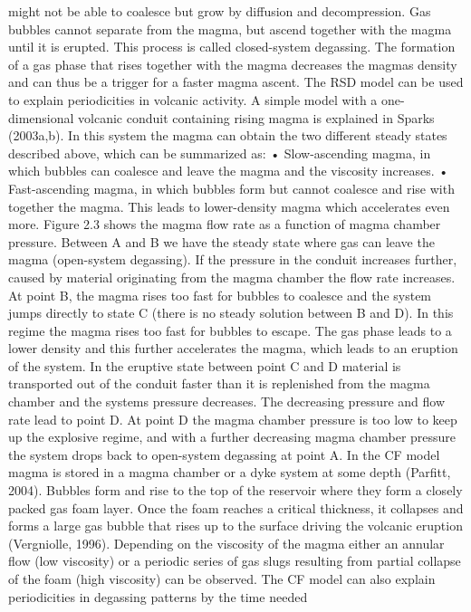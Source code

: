 \documentclass  [
  paper    = a4,
  BCOR     = 10mm,
  twoside,
  fontsize = 12pt,
  fleqn,
  toc      = bibnumbered,
  toc      = listofnumbered,
  numbers  = noendperiod,
  headings = normal,
  listof   = leveldown,
  version  = 3.03
]                                       {scrreprt}
\begin{document}
	might not be able to coalesce but grow by diffusion and decompression. Gas
	bubbles cannot separate from the magma, but ascend together with the magma
	until it is erupted. This process is called closed-system degassing. The formation
	of a gas phase that rises together with the magma decreases the magmas density
	and can thus be a trigger for a faster magma ascent.
	The RSD model can be used to explain periodicities in volcanic activity. A
	simple model with a one-dimensional volcanic conduit containing rising magma
	is explained in Sparks (2003a,b). In this system the magma can obtain the two
	different steady states described above, which can be summarized as:
	• Slow-ascending magma, in which bubbles can coalesce and leave the magma
	and the viscosity increases.
	• Fast-ascending magma, in which bubbles form but cannot coalesce and
	rise with together the magma. This leads to lower-density magma which
	accelerates even more.
Figure 2.3 shows the magma flow rate as a function of magma chamber pressure.
Between A and B we have the steady state where gas can leave the magma
(open-system degassing). If the pressure in the conduit increases further, caused
by material originating from the magma chamber the flow rate increases. At
point B, the magma rises too fast for bubbles to coalesce and the system jumps
directly to state C (there is no steady solution between B and D). In this regime
the magma rises too fast for bubbles to escape. The gas phase leads to a lower
density and this further accelerates the magma, which leads to an eruption of
the system. In the eruptive state between point C and D material is transported
out of the conduit faster than it is replenished from the magma chamber and
the systems pressure decreases. The decreasing pressure and flow rate lead to
point D. At point D the magma chamber pressure is too low to keep up the
explosive regime, and with a further decreasing magma chamber pressure the
system drops back to open-system degassing at point A.
In the CF model magma is stored in a magma chamber or a dyke system at
some depth (Parfitt, 2004). Bubbles form and rise to the top of the reservoir
where they form a closely packed gas foam layer. Once the foam reaches a critical
thickness, it collapses and forms a large gas bubble that rises up to the surface
driving the volcanic eruption (Vergniolle, 1996). Depending on the viscosity of
the magma either an annular flow (low viscosity) or a periodic series of gas slugs
resulting from partial collapse of the foam (high viscosity) can be observed. The
CF model can also explain periodicities in degassing patterns by the time needed
\end{document}
